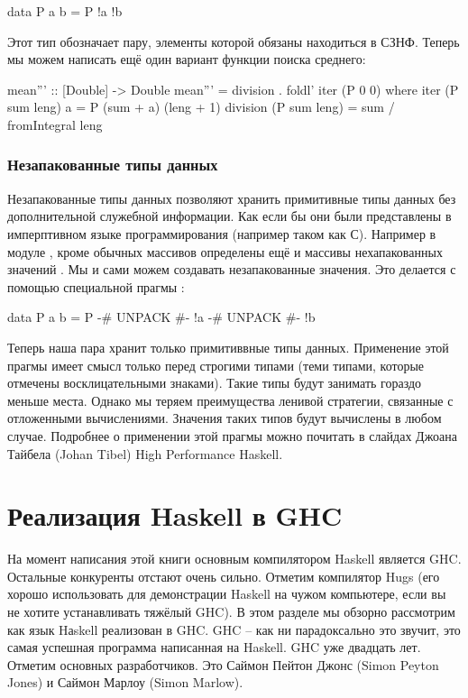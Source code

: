 \begin{code}
data P a b = P !a !b
\end{code}

Этот тип обозначает пару, элементы которой обязаны находиться
в СЗНФ. Теперь мы можем написать ещё один вариант функции
поиска среднего:

\begin{code}
mean''' :: [Double] -> Double
mean''' = division . foldl' iter (P 0 0)
    where iter (P sum leng) a = P (sum  + a) (leng + 1)
          division (P sum leng) = sum / fromIntegral leng
\end{code}

\subsubsection{Незапакованные типы данных}

Незапакованные типы данных позволяют хранить примитивные
типы данных без дополнительной служебной информации.
Как если бы они были представлены в имперптивном языке 
программирования (например таком как С). Например в
модуле , кроме обычных массивов  
определены ещё и массивы нехапакованных значений .
Мы и сами можем создавать незапакованные значения. 
Это делается с помощью специальной прагмы :

\begin{code}
data P a b = P {-# UNPACK #-} !a 
               {-# UNPACK #-} !b
\end{code}

Теперь наша пара хранит только примитиввные типы данных.
Применение этой прагмы имеет смысл только перед строгими типами
(теми типами, которые отмечены восклицательными знаками).
Такие типы будут занимать гораздо меньше места. Однако
мы теряем преимущества ленивой стратегии, связанные с 
отложенными вычислениями. Значения таких типов
будут вычислены в любом случае. Подробнее о применении
этой прагмы можно почитать в слайдах Джоана Тайбела (Johan Tibel) 
High Performance Haskell.


\section{Реализация Haskell в GHC}

На момент написания этой книги основным компилятором
Haskell является GHC. Остальные конкуренты отстают очень
сильно. Отметим компилятор Hugs (его хорошо использовать 
для демонстрации Haskell на чужом компьютере, если вы не хотите
устанавливать тяжёлый GHC).
В этом разделе мы обзорно рассмотрим как язык Hаskell 
реализован в GHC. 
GHC -- как ни парадоксально это звучит, это самая успешная
программа написанная на Haskell. GHC уже двадцать лет.
Отметим основных разработчиков. Это Саймон Пейтон Джонс
(Simon Peyton Jones) и Саймон Марлоу (Simon Marlow).

